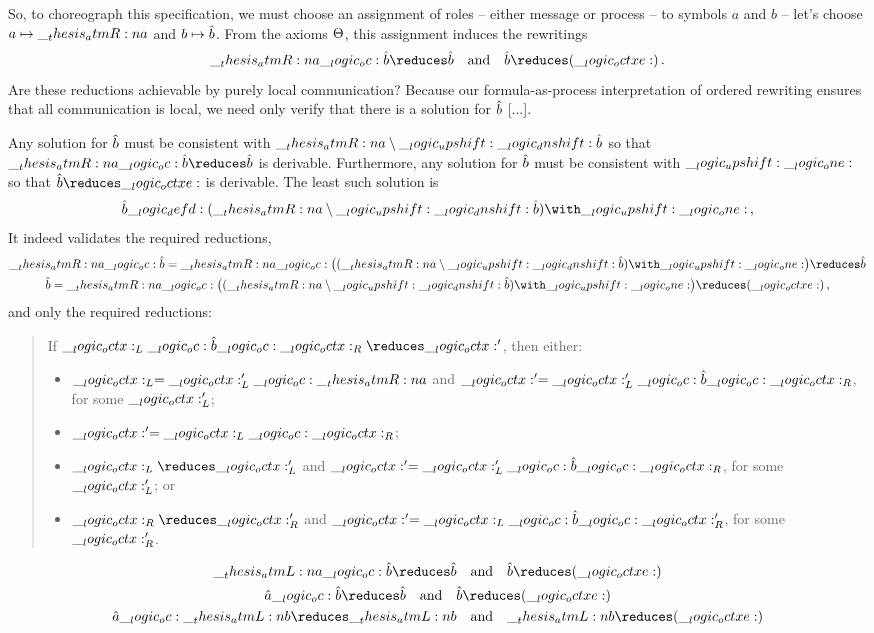 So, to choreograph this specification, we must choose an assignment of roles -- either message or process -- to symbols $a$ and $b$ --
let's choose $a \mapsto \__thesis_atmR:n {a}$ and $b \mapsto \hat{b}$.
From the axioms $\Theta$, this assignment induces the rewritings
\begin{equation*}
  \atmR{a} \oc \defp{b} \reduces \defp{b}
  \quad\text{and}\quad
  \defp{b} \reduces (\octxe)
  \,.
\end{equation*}
Are these reductions achievable by purely local communication?
Because our formula-as-process interpretation of ordered rewriting ensures that all communication is local, we need only verify that there is a solution for $\hat{b}$ [...].

Any solution for $\hat{b}$ must be consistent with $\__thesis_atmR:n {a} \mathbin { \setminus } \__logic_upshift: \__logic_dnshift: \hat{b}$ so that $\atmR{a} \oc \defp{b} \reduces \defp{b}$ is derivable.
Furthermore, any solution for $\hat{b}$ must be consistent with $\__logic_upshift: \__logic_one:$ so that $\defp{b} \reduces \octxe$ is derivable.
The least such solution is
\begin{equation*}
  \defp{b} \defd (\atmR{a} \limp \up \dn \defp{b}) \with \up \one
  \,,
\end{equation*}
It indeed validates the required reductions,
\begin{gather*}
  \atmR{a} \oc \defp{b} = \atmR{a} \oc \bigl((\atmR{a} \limp \up \dn \defp{b}) \with \up \one\bigr) \reduces \defp{b} \\
  \defp{b} = \atmR{a} \oc \bigl((\atmR{a} \limp \up \dn \defp{b}) \with \up \one\bigr) \reduces (\octxe)
  \,,
\end{gather*}
and only the required reductions:
\begin{quotation}
  If $\octx_L \oc \defp{b} \oc \octx_R \reduces \octx'$, then either:
  \begin{itemize}
  \item $\__logic_octx:_L = \__logic_octx:'_L \__logic_oc: \__thesis_atmR:n {a}$ and $\__logic_octx:' = \__logic_octx:'_L \__logic_oc: \hat{b} \__logic_oc: \__logic_octx:_R$, for some $\__logic_octx:'_L$;
  \item $\__logic_octx:' = \__logic_octx:_L \__logic_oc: \__logic_octx:_R$;
  \item $\octx_L \reduces \octx'_L$ and $\__logic_octx:' = \__logic_octx:'_L \__logic_oc: \hat{b} \__logic_oc: \__logic_octx:_R$, for some $\__logic_octx:'_L$; or
  \item $\octx_R \reduces \octx'_R$ and $\__logic_octx:' = \__logic_octx:_L \__logic_oc: \hat{b} \__logic_oc: \__logic_octx:'_R$, for some $\__logic_octx:'_R$.
  \end{itemize}
\end{quotation}

\begin{gather*}
  \atmL{a} \oc \defp{b} \reduces \defp{b}
  \quad\text{and}\quad
  \defp{b} \reduces (\octxe)
  \\
  \defp{a} \oc \defp{b} \reduces \defp{b}
  \quad\text{and}\quad
  \defp{b} \reduces (\octxe)
  \\
  \defp{a} \oc \atmL{b} \reduces \atmL{b}
  \quad\text{and}\quad
  \atmL{b} \reduces (\octxe)
\end{gather*}



